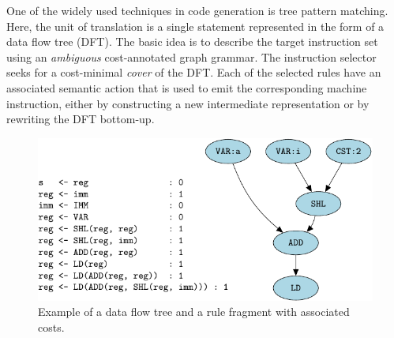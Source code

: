 One of the widely used techniques in code generation is tree pattern
matching. Here, the unit of translation is a single statement
represented in the form of a data flow tree (DFT). The basic idea is
to describe the target instruction set using an \emph{ambiguous}
cost-annotated graph grammar. The instruction selector seeks for a
cost-minimal \emph{cover} of the DFT. Each of the selected rules have
an associated semantic action that is used to emit the corresponding
machine instruction, either by constructing a new intermediate
representation or by rewriting the DFT bottom-up.
\begin{figure}[ht]
  \begin{center}



    \includegraphics{pgf-fig002}
  \end{center}
  \caption{Example of a data flow tree and a rule fragment with
    associated costs.}\label{fig:tpm}
\end{figure}

